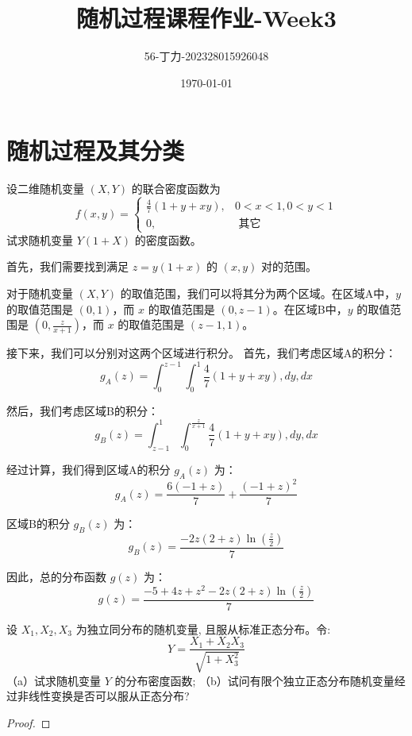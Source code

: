 \documentclass[a4,10pt]{ctexart}
\begin{document}
\title{随机过程课程作业-\textbf{Week3}}
\author{56-丁力-202328015926048}
\date{\today}
\maketitle
\tableofcontents
\newpage
{}
\newpage

\section{随机过程及其分类}

\begin{ti}{5}{}

    设二维随机变量 $(X, Y)$ 的联合密度函数为
    $$
    f(x, y)=\left\{\begin{array}{lc}
    \frac{4}{7}(1+y+x y), & 0<x<1,0<y<1 \\
    0, & \text { 其它 }
    \end{array}\right.
    $$
    试求随机变量 $Y(1+X)$ 的密度函数。
\end{ti}
    \begin{qj}\end{qj}

   
    
    首先，我们需要找到满足 $z = y(1+x)$ 的 $(x,y)$ 对的范围。

    对于随机变量 $(X, Y)$ 的取值范围，我们可以将其分为两个区域。在区域A中，$y$ 的取值范围是 $(0, 1)$，而 $x$ 的取值范围是 $(0, z-1)$。在区域B中，$y$ 的取值范围是 $(0, \frac{z}{x+1})$，而 $x$ 的取值范围是 $(z-1, 1)$。

    
    接下来，我们可以分别对这两个区域进行积分。
    首先，我们考虑区域A的积分：
    $$
    g_A(z) = \int_{0}^{z-1} \int_{0}^{1} \frac{4}{7}(1+y+xy) , dy , dx
    $$
    
    然后，我们考虑区域B的积分：
    $$
    g_B(z) = \int_{z-1}^{1} \int_{0}^{\frac{z}{x+1}} \frac{4}{7}(1+y+xy) , dy , dx
    $$
    
    经过计算，我们得到区域A的积分 $g_A(z)$ 为：
    $$
    g_A(z) = \frac{6(-1 + z)}{7} + \frac{(-1 + z)^2}{7}
    $$
    
    区域B的积分 $g_B(z)$ 为：
    $$
    g_B(z) = \frac{-2z(2+z)\ln\left(\frac{z}{2}\right)}{7}
    $$
    
    因此，总的分布函数 $g(z)$ 为：
    $$
    g(z) = \frac{-5 + 4z + z^2 - 2z(2 + z)\ln\left(\frac{z}{2}\right)}{7}
    $$
    


    
    \begin{ti}{6}{}

        设 $X_1, X_2 , X_3$ 为独立同分布的随机变量, 且服从标准正态分布。令:
        $$
        Y=\frac{X_1+X_2 X_3}{\sqrt{1+X_3^2}}
        $$
        （a）试求随机变量 $Y$ 的分布密度函数;
        （b）试问有限个独立正态分布随机变量经过非线性变换是否可以服从正态分布?
    
\end{ti}
    \begin{proof}

    \end{proof}
  
\end{document}
